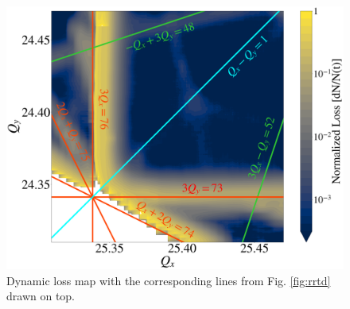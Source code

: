 \begin{figure}[H]
    \centering
    \includegraphics[width=\columnwidth]{chapter4/bare_comments.png}
    \caption{Dynamic loss map with the corresponding lines from Fig. \ref{fig:rrtd} drawn on top.}
    \label{fig:bare_comments}
\end{figure}


